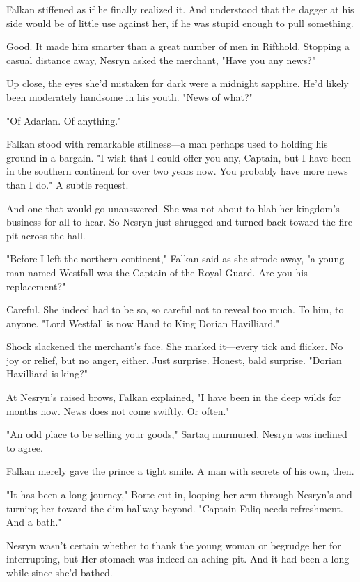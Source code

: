 Falkan stiffened as if he finally realized it. And understood that the dagger at his side would be of little use against her, if he was stupid enough to pull something.

Good. It made him smarter than a great number of men in Rifthold. Stopping a casual distance away, Nesryn asked the merchant, "Have you any news?"

Up close, the eyes she'd mistaken for dark were a midnight sapphire. He'd likely been moderately handsome in his youth. "News of what?"

"Of Adarlan. Of  anything."

Falkan stood with remarkable stillness---a man perhaps used to holding his ground in a bargain. "I wish that I could offer you any, Captain, but I have been in the southern continent for over two years now. You probably have more news than I do." A subtle request.

And one that would go unanswered. She was not about to blab her kingdom's business for all to hear. So Nesryn just shrugged and turned back toward the fire pit across the hall.

"Before I left the northern continent," Falkan said as she strode away, "a young man named Westfall was the Captain of the Royal Guard. Are you his replacement?"

Careful. She indeed had to be so, so careful not to reveal too much. To him, to anyone. "Lord Westfall is now Hand to King Dorian Havilliard."

Shock slackened the merchant's face. She marked it---every tick and flicker. No joy or relief, but no anger, either. Just  surprise. Honest, bald surprise. "Dorian Havilliard is king?"

At Nesryn's raised brows, Falkan explained, "I have been in the deep wilds for months now. News does not come swiftly. Or often."

"An odd place to be selling your goods," Sartaq murmured. Nesryn was inclined to agree.

Falkan merely gave the prince a tight smile. A man with secrets of his own, then.

"It has been a long journey," Borte cut in, looping her arm through Nesryn's and turning her toward the dim hallway beyond. "Captain Faliq needs refreshment. And a bath."

Nesryn wasn't certain whether to thank the young woman or begrudge her for interrupting, but  Her stomach was indeed an aching pit. And it had been a long while since she'd bathed.

